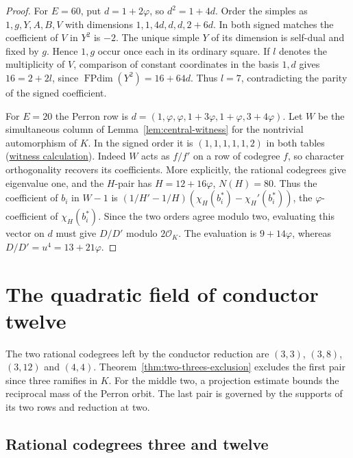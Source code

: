 \documentclass[11pt,reqno]{amsart}
\newcommand{\codecheck}[2]{\href{https://github.com/sebastienpalcoux/grothendieck-ring-classification/blob/d5750105bb5758f3ad38d2e5464dfcc12c019816/supplements/rank6/sphericality/#1}{#2}}
\theoremstyle{remark}\newtheorem{remark}[theorem]{Remark}
\numberwithin{equation}{section}
\begin{document}
\begin{proof}
For $E=60$, put $d=1+2\varphi$, so $d^2=1+4d$. Order the
simples as $1,g,Y,A,B,V$ with dimensions
$1,1,4d,d,d,2+6d$. In both signed matches the coefficient of $V$
in $Y^2$ is $-2$. The unique simple $Y$ of its dimension is
self-dual and fixed by $g$. Hence $1,g$ occur once each in its
ordinary square. If $l$ denotes the multiplicity of $V$, comparison
of constant coordinates in the basis $1,d$ gives
$16=2+2l$, since $\operatorname{FPdim}(Y^2)=16+64d$.
Thus $l=7$, contradicting the parity of the signed coefficient.

For $E=20$ the Perron row is
$d=(1,\varphi,\varphi,1+3\varphi,1+\varphi,3+4\varphi)$.
Let $W$ be the simultaneous column of Lemma~\ref{lem:central-witness}
for the nontrivial automorphism of $K$. In the signed order it is
$(1,1,1,1,1,2)$ in both tables
(\codecheck{golden_witness_parity.py}{witness calculation}).
Indeed $W$ acts as $f/f'$ on a row of codegree $f$, so character
orthogonality recovers its coefficients. More explicitly, the
rational codegrees give eigenvalue one, and the $H$-pair has
$H=12+16\varphi$, $N(H)=80$. Thus the coefficient of $b_i$ in
$W-1$ is
$(1/H'-1/H)(\chi_H(b_i^*)-\chi_H'(b_i^*))$, the
$\varphi$-coefficient of $\chi_H(b_i^*)$.
Since the two orders agree modulo two, evaluating this vector on
$d$ must give $D/D'$ modulo $2\mathcal O_K$. The evaluation is
$9+14\varphi$, whereas $D/D'=u^4=13+21\varphi$.
\end{proof}

\section{The quadratic field of conductor twelve}
\label{sec:quadratic-twelve-cases}
The two rational codegrees left by the conductor reduction are
$(3,3)$, $(3,8)$, $(3,12)$ and $(4,4)$.
Theorem~\ref{thm:two-threes-exclusion} excludes the first pair since three ramifies in $K$.
For the middle two, a projection estimate bounds the reciprocal
mass of the Perron orbit. The last pair is governed by the supports
of its two rows and reduction at two.

\subsection{Rational codegrees three and twelve}
\label{sec:twelve-3-12}
\end{document}
